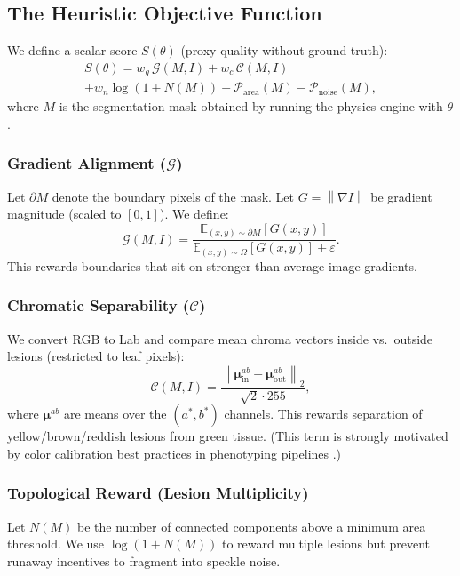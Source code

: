 \documentclass[journal]{IEEEtran}
\newcommand{\E}{\mathbb{E}}
\newcommand{\grad}{\nabla}
\newcommand{\norm}[1]{\left\lVert #1 \right\rVert}
\begin{document}
\subsection{The Heuristic Objective Function}
\label{sec:objective}
We define a scalar score $S(\theta)$ (proxy quality without ground truth):
\begin{multline}
S(\theta) = w_g \,\mathcal{G}(M,I) + w_c \,\mathcal{C}(M,I) \\
            + w_n \log(1{+}N(M))
            - \mathcal{P}_{\mathrm{area}}(M) - \mathcal{P}_{\mathrm{noise}}(M),
\label{eq:objective}
\end{multline}
where $M$ is the segmentation mask obtained by running the physics engine with $\theta$.

\subsubsection{Gradient Alignment ($\mathcal{G}$)}
Let $\partial M$ denote the boundary pixels of the mask. Let $G=\norm{\grad I}$ be gradient magnitude (scaled to $[0,1]$). We define:
\begin{equation}
\mathcal{G}(M,I) = \frac{\E_{(x,y)\sim \partial M}[G(x,y)]}{\E_{(x,y)\sim \Omega}[G(x,y)] + \varepsilon}.
\end{equation}
This rewards boundaries that sit on stronger-than-average image gradients.

\subsubsection{Chromatic Separability ($\mathcal{C}$)}
We convert RGB to Lab and compare mean chroma vectors inside vs.\ outside lesions (restricted to leaf pixels):
\begin{equation}
\mathcal{C}(M,I) = \frac{\norm{\bm{\mu}_{\mathrm{in}}^{ab}-\bm{\mu}_{\mathrm{out}}^{ab}}_2}{\sqrt{2}\cdot 255},
\end{equation}
where $\bm{\mu}^{ab}$ are means over the $(a^\ast,b^\ast)$ channels. This rewards separation of yellow/brown/reddish lesions from green tissue. (This term is strongly motivated by color calibration best practices in phenotyping pipelines \cite{berry2018color,plantcv2025}.)

\subsubsection{Topological Reward (Lesion Multiplicity)}
Let $N(M)$ be the number of connected components above a minimum area threshold. We use $\log(1+N(M))$ to reward multiple lesions but prevent runaway incentives to fragment into speckle noise.
\end{document}

